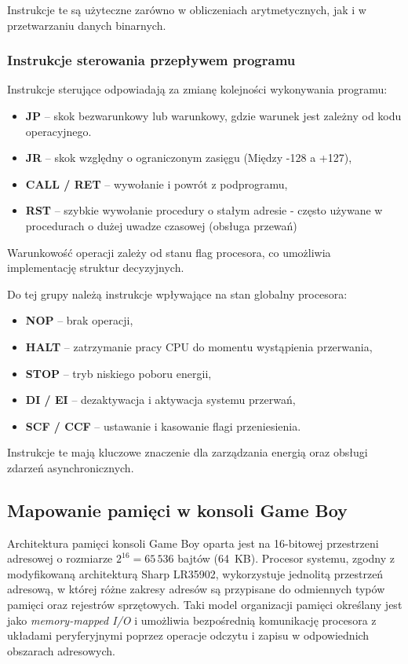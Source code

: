 \documentclass{article}
\begin{document}
Instrukcje te są użyteczne zarówno w obliczeniach arytmetycznych, jak i w przetwarzaniu danych binarnych.

\subsubsection{Instrukcje sterowania przepływem programu}

Instrukcje sterujące odpowiadają za zmianę kolejności wykonywania programu:

\begin{itemize}
	\item \textbf{JP} -- skok bezwarunkowy lub warunkowy, gdzie warunek jest zależny od kodu operacyjnego.
	\item \textbf{JR} -- skok względny o ograniczonym zasięgu  (Między -128 a +127),
	\item \textbf{CALL / RET} -- wywołanie i powrót z podprogramu,
	\item \textbf{RST} -- szybkie wywołanie procedury o stałym adresie - często używane w procedurach o dużej uwadze czasowej (obsługa przewań)
\end{itemize}

Warunkowość operacji zależy od stanu flag procesora, co umożliwia implementację struktur decyzyjnych.

Do tej grupy należą instrukcje wpływające na stan globalny procesora:

\begin{itemize}
	\item \textbf{NOP} -- brak operacji,
	\item \textbf{HALT} -- zatrzymanie pracy CPU do momentu wystąpienia przerwania,
	\item \textbf{STOP} -- tryb niskiego poboru energii,
	\item \textbf{DI / EI} -- dezaktywacja i aktywacja systemu przerwań,
	\item \textbf{SCF / CCF} -- ustawanie i kasowanie flagi przeniesienia.
\end{itemize}

Instrukcje te mają kluczowe znaczenie dla zarządzania energią oraz obsługi zdarzeń asynchronicznych.


\subsection{Mapowanie pamięci w konsoli Game Boy}

Architektura pamięci konsoli Game Boy oparta jest na 16-bitowej przestrzeni adresowej o rozmiarze $2^{16} = 65\,536$ bajtów (64~KB). Procesor systemu, zgodny z modyfikowaną architekturą Sharp LR35902, wykorzystuje jednolitą przestrzeń adresową, w której różne zakresy adresów są przypisane do odmiennych typów pamięci oraz rejestrów sprzętowych. Taki model organizacji pamięci określany jest jako \emph{memory-mapped I/O} i umożliwia bezpośrednią komunikację procesora z układami peryferyjnymi poprzez operacje odczytu i zapisu w odpowiednich obszarach adresowych.
\end{document}
